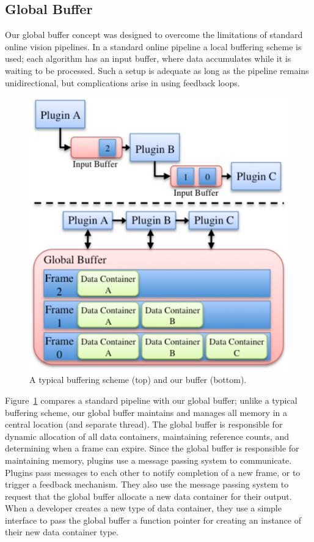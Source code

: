 \subsection{Global Buffer}
Our global buffer concept was designed to overcome the limitations of standard online vision pipelines. In a standard online pipeline a local buffering scheme is used; each algorithm has an input buffer, where data accumulates while it is waiting to be processed. Such a setup is adequate as long as the  pipeline remains unidirectional, but complications arise in using feedback loops.
\begin{figure}[t]
\begin{center}
   \includegraphics[width=0.6\linewidth]{BufferComparaison.pdf}
\end{center}
   \caption{A typical buffering scheme (top) and our buffer (bottom).}
\label{fig:BufferFig}
\end{figure}
Figure~\ref{fig:BufferFig} compares a standard pipeline with our global buffer; unlike a typical buffering scheme, our global buffer maintains and manages all memory in a central location (and separate thread). The global buffer is responsible for dynamic allocation of all data containers, maintaining reference counts, and determining when a frame can expire. Since the global buffer is responsible for maintaining memory, plugins use a message passing system to communicate. Plugins pass messages to each other to notify completion of a new frame, or to trigger a feedback mechanism. They also use the message passing system to request that the global buffer allocate a new data container for their output. When a developer creates a new type of data container, they use a simple interface to pass the global buffer a function pointer for creating an instance of their new data container type. 

